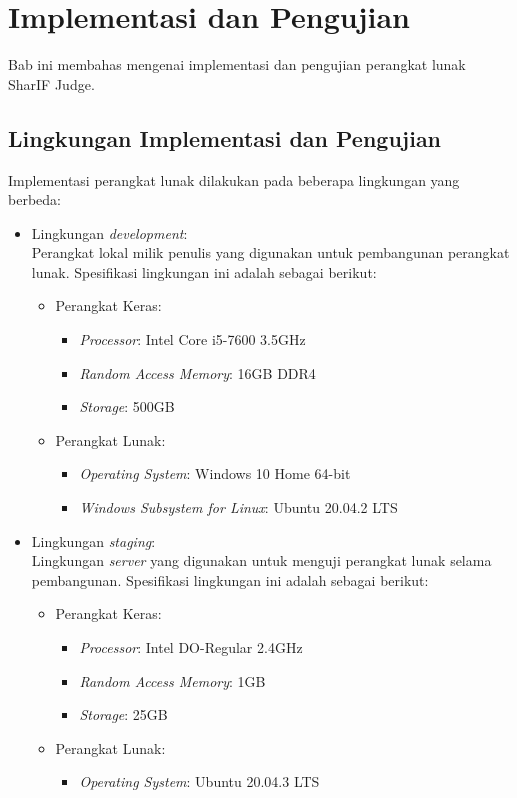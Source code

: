 \chapter{Implementasi dan Pengujian}
\label{chap:implementasidanpengujian}

Bab ini membahas mengenai implementasi dan pengujian perangkat lunak SharIF Judge.

\section{Lingkungan Implementasi dan Pengujian}
\label{sec:5:lingkungan}

Implementasi perangkat lunak dilakukan pada beberapa lingkungan yang berbeda:

\begin{itemize}
    \item Lingkungan \textit{development}: \\ Perangkat lokal milik penulis yang digunakan untuk pembangunan perangkat lunak. Spesifikasi lingkungan ini adalah sebagai berikut:
    \begin{itemize}
        \item Perangkat Keras:
        \begin{itemize}
            \item \textit{Processor}: Intel Core i5-7600 3.5GHz
            \item \textit{Random Access Memory}: 16GB DDR4
            \item \textit{Storage}: 500GB
        \end{itemize}
            \item Perangkat Lunak:
        \begin{itemize}
            \item \textit{Operating System}: Windows 10 Home 64-bit
            \item \textit{Windows Subsystem for Linux}: Ubuntu 20.04.2 LTS
        \end{itemize}
    \end{itemize}
    
    \item Lingkungan \textit{staging}: \\ Lingkungan \textit{server} yang digunakan untuk menguji perangkat lunak selama pembangunan. Spesifikasi lingkungan ini adalah sebagai berikut:
    \begin{itemize}
    \item Perangkat Keras:
        \begin{itemize}
            \item \textit{Processor}: Intel DO-Regular 2.4GHz
            \item \textit{Random Access Memory}: 1GB
            \item \textit{Storage}: 25GB
        \end{itemize}
            \item Perangkat Lunak:
        \begin{itemize}
            \item \textit{Operating System}: Ubuntu 20.04.3 LTS
        \end{itemize}
    \end{itemize}
    

\end{itemize}
